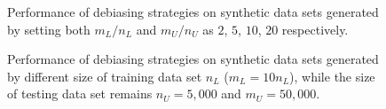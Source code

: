\begin{figure}[!t]
  \centering
  \caption{\label{fig:mnratio}
  Performance of debiasing strategies on synthetic data sets 
  generated by setting both $m_L/n_L$ and $m_U/n_U$ as $2$, $5$, $10$, $20$ respectively.
  }
\end{figure}

\begin{figure}[!t]
  \centering
  \caption{\label{fig:trainratio}
  Performance of debiasing strategies on synthetic data sets 
  generated by different size of training data set $n_L$ ($m_L=10n_L$), 
  while the size of testing data set remains $n_U=5,000$ and $m_U=50,000$.
  }
  \vspace{-0.2in}
\end{figure}


